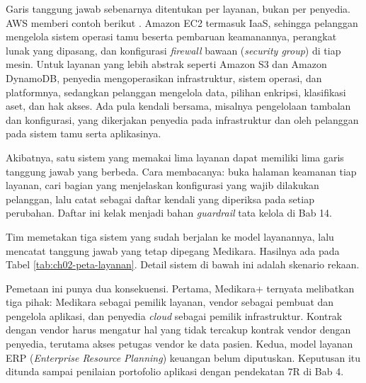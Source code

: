 \begin{pendalaman}
  Garis tanggung jawab sebenarnya ditentukan per layanan, bukan per penyedia. AWS memberi
  contoh berikut \cite{c02-aws-shared}. Amazon EC2 termasuk IaaS, sehingga pelanggan
  mengelola sistem operasi tamu beserta pembaruan keamanannya, perangkat lunak yang
  dipasang, dan konfigurasi \textit{firewall} bawaan (\textit{security group}) di tiap
  mesin. Untuk layanan yang lebih abstrak seperti Amazon S3 dan Amazon DynamoDB, penyedia
  mengoperasikan infrastruktur, sistem operasi, dan platformnya, sedangkan pelanggan
  mengelola data, pilihan enkripsi, klasifikasi aset, dan hak akses. Ada pula kendali
  bersama, misalnya pengelolaan tambalan dan konfigurasi, yang dikerjakan penyedia pada
  infrastruktur dan oleh pelanggan pada sistem tamu serta aplikasinya.

  Akibatnya, satu sistem yang memakai lima layanan dapat memiliki lima garis tanggung jawab
  yang berbeda. Cara membacanya: buka halaman keamanan tiap layanan, cari bagian yang
  menjelaskan konfigurasi yang wajib dilakukan pelanggan, lalu catat sebagai daftar kendali
  yang diperiksa pada setiap perubahan. Daftar ini kelak menjadi bahan \textit{guardrail}
  tata kelola di Bab 14.
\end{pendalaman}

\begin{kasus}[title={Kasus Medikara Health: Memetakan Surel, ERP, dan Medikara+}]
  Tim memetakan tiga sistem yang sudah berjalan ke model layanannya, lalu mencatat tanggung
  jawab yang tetap dipegang Medikara. Hasilnya ada pada Tabel \ref{tab:ch02-peta-layanan}.
  Detail sistem di bawah ini adalah skenario rekaan.

  Pemetaan ini punya dua konsekuensi. Pertama, Medikara+ ternyata melibatkan tiga pihak:
  Medikara sebagai pemilik layanan, vendor sebagai pembuat dan pengelola aplikasi, dan
  penyedia \textit{cloud} sebagai pemilik infrastruktur. Kontrak dengan vendor harus
  mengatur hal yang tidak tercakup kontrak vendor dengan penyedia, terutama akses petugas
  vendor ke data pasien. Kedua, model layanan ERP (\textit{Enterprise Resource Planning})
  keuangan belum diputuskan. Keputusan itu ditunda sampai penilaian portofolio aplikasi
  dengan pendekatan 7R di Bab 4.
\end{kasus}


